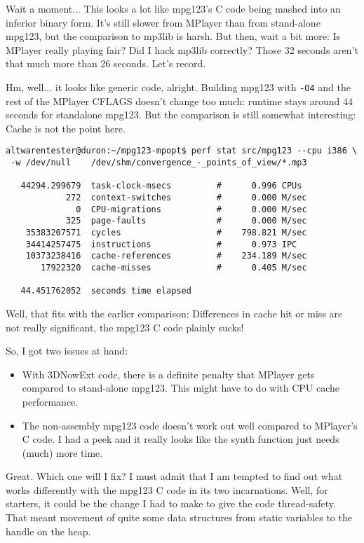 \documentclass[a4paper,12pt]{scrartcl}
\begin{document}
Wait a moment... This looks a lot like mpg123's C code being mashed into an inferior binary form.
It's still slower from MPlayer than from stand-alone mpg123, but the comparison to mp3lib is harsh.
But then, wait a bit more: Is MPlayer really playing fair? Did I hack mp3lib correctly?
Those 32 seconds aren't that much more than 26 seconds. Let's record.

Hm, well... it looks like generic code, alright. Building mpg123 with \verb:-O4: and the rest of the MPlayer CFLAGS doesn't change too much: runtime stays around 44 seconds for standalone mpg123.
But the comparison is still somewhat interesting: Cache is not the point here.
\begin{verbatim}
altwarentester@duron:~/mpg123-mpopt$ perf stat src/mpg123 --cpu i386 \
 -w /dev/null    /dev/shm/convergence_-_points_of_view/*.mp3

   44294.299679  task-clock-msecs         #      0.996 CPUs 
            272  context-switches         #      0.000 M/sec
              0  CPU-migrations           #      0.000 M/sec
            325  page-faults              #      0.000 M/sec
    35383207571  cycles                   #    798.821 M/sec
    34414257475  instructions             #      0.973 IPC  
    10373238416  cache-references         #    234.189 M/sec
       17922320  cache-misses             #      0.405 M/sec

   44.451762052  seconds time elapsed
\end{verbatim}
Well, that fits with the earlier comparison: Differences in cache hit or miss are not really significant, the mpg123 C code plainly sucks!

So, I got two issues at hand:
\begin{itemize}
	\item With 3DNowExt code, there is a definite penalty that MPlayer gets compared to stand-alone mpg123. This might have to do with CPU cache performance.
	\item The non-assembly mpg123 code doesn't work out well compared to MPlayer's C code. I had a peek and it really looks like the synth function just needs (much) more time.
\end{itemize}
Great. Which one will I fix? I must admit that I am tempted to find out what works differently with the mpg123 C code in its two incarnations. Well, for starters, it could be the change I had to make to give the code thread-safety. That meant movement of quite some data structures from static variables to the handle on the heap.
\end{document}
